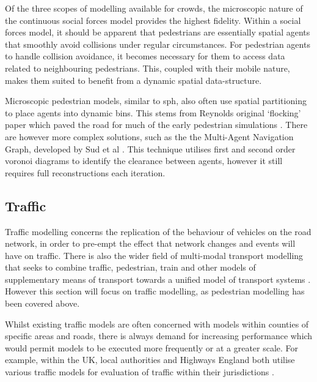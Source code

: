     Of the three scopes of modelling available for crowds, the microscopic nature of the continuous social forces model provides the highest fidelity. Within a social forces model, it should be apparent that pedestrians are essentially spatial agents that smoothly avoid collisions under regular circumstances. For pedestrian agents to handle collision avoidance, it becomes necessary for them to access data related to neighbouring pedestrians. This, coupled with their mobile nature, makes them suited to benefit from a dynamic spatial data-structure.

    Microscopic pedestrian models, similar to \gls{sph}, also often use spatial partitioning to place agents into dynamic bins. This stems from Reynolds original `flocking' paper which paved the road for much of the early pedestrian simulations \cite{Rey87}. There are however more complex solutions, such as the the Multi-Agent Navigation Graph, developed by Sud et al \cite{SA*08}. This technique utilises first and second order voronoi diagrams to identify the clearance between agents, however it still requires full reconstructions each iteration.

  \subsection{Traffic\label{sub:traffic-modelling}}
    Traffic modelling concerns the replication of the behaviour of vehicles on the road network, in order to pre-empt the effect that network changes and events will have on traffic. There is also the wider field of multi-modal transport modelling that seeks to combine traffic, pedestrian, train and other models of supplementary means of transport towards a unified model of transport systems \cite{CF*03}. However this section will focus on traffic modelling, as pedestrian modelling has been covered above. %
    
    Whilst existing traffic models are often concerned with models within counties of specific areas and roads, there is always demand for increasing performance which would permit models to be executed more frequently or at a greater scale. For example, within the UK, local authorities and Highways England both utilise various traffic models for evaluation of traffic within their jurisdictions \cite{NEYH_MODELs}. %
    
